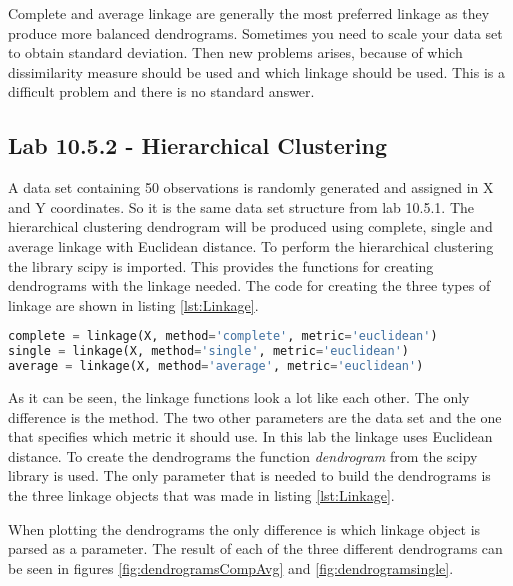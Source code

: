 Complete and average linkage are generally the most preferred linkage as they produce more balanced dendrograms. Sometimes you need to scale your data set to obtain standard deviation. Then new problems arises, because of which dissimilarity measure should be used and which linkage should be used. This is a difficult problem and there is no standard answer.

\subsection{Lab 10.5.2 - Hierarchical Clustering}
A data set containing 50 observations is randomly generated and assigned in X and Y coordinates. So it is the same data set structure from lab 10.5.1.
The hierarchical clustering dendrogram will be produced using complete, single and average linkage with Euclidean distance.
To perform the hierarchical clustering the library scipy is imported. This provides the functions for creating dendrograms with the linkage needed. 
The code for creating the three types of linkage are shown in listing \ref{lst:Linkage}.

\begin{lstlisting}[language=Python, label=lst:Linkage, caption=The code that applies the three different linkage on the data set]
complete = linkage(X, method='complete', metric='euclidean')
single = linkage(X, method='single', metric='euclidean') 
average = linkage(X, method='average', metric='euclidean')
\end{lstlisting}

As it can be seen, the linkage functions look a lot like each other. The only difference is the method. The two other parameters are the data set and the one that specifies which metric it should use. In this lab the linkage uses Euclidean distance. 
To create the dendrograms the function \emph{dendrogram} from the scipy library is used. The only parameter that is needed to build the dendrograms is the three linkage objects that was made in listing \ref{lst:Linkage}.

When plotting the dendrograms the only difference is which linkage object is parsed as a parameter.
The result of each of the three different dendrograms can be seen in figures \ref{fig:dendrogramsCompAvg} and \ref{fig:dendrogramsingle}.




